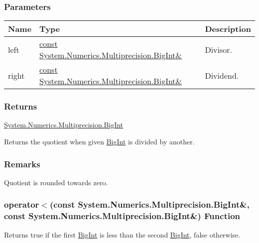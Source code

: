 \documentclass[a4paper,oneside,11.000000pt]{book}
\begin{document}
\subsubsection*{Parameters}
\begin{flushleft}
\begin{supertabular}[l]{!{\raggedright}p{1.30721cm}!{\raggedright}p{8.55945cm}!{\raggedright}p{2.65538cm}}
\textbf{Name}
& \textbf{Type}
& \textbf{Description}
\\
\hline
left
& \hyperlink{System.Numerics.Multiprecision.BigInt}{const System.\-Numerics.\-Multiprecision.\-BigInt\&\-}
& Divisor.

\\
right
& \hyperlink{System.Numerics.Multiprecision.BigInt}{const System.\-Numerics.\-Multiprecision.\-BigInt\&\-}
& Dividend.

\\
\end{supertabular}

\end{flushleft}
\subsubsection*{Returns}
\hyperlink{System.Numerics.Multiprecision.BigInt}{System.\-Numerics.\-Multiprecision.\-BigInt}
\begin{flushleft}
Returns the quotient when given \hyperlink{System.Numerics.Multiprecision.BigInt}{BigInt} is divided by another.

\end{flushleft}
\subsubsection*{Remarks}
\begin{flushleft}
Quotient is rounded towards zero.

\end{flushleft}
\clearpage

\hypertarget{System.Numerics.Multiprecision.operator.less.C.R.System.Numerics.Multiprecision.BigInt.C.R.System.Numerics.Multiprecision.BigInt}{\subsubsection*{operator$<$(const System.Numerics.Multiprecision.BigInt\&, const System.Numerics.Multiprecision.BigInt\&) Function}}
\begin{flushleft}
Returns true if the first \hyperlink{System.Numerics.Multiprecision.BigInt}{BigInt} is less than the second \hyperlink{System.Numerics.Multiprecision.BigInt}{BigInt}, false otherwise.

\end{flushleft}
\end{document}
